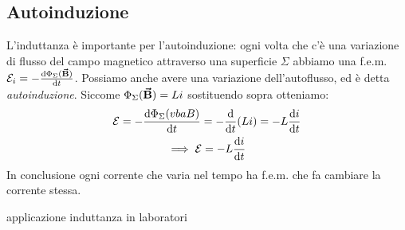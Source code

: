 \subsection{Autoinduzione}
L'induttanza è importante per l'autoinduzione: ogni volta che c'è una variazione di flusso del campo magnetico attraverso una superficie $\Sigma$ abbiamo una f.e.m. $\mathcal{E}_i=-\dv{\Phi_\Sigma (\vb*{\va{B}})}{t}$. Possiamo anche avere una variazione dell'autoflusso, ed è detta \textit{autoinduzione}.
Siccome $\Phi_\Sigma(\vb*{\va{B}})=Li$ sostituendo sopra otteniamo:
\begin{gather*}
	\mathcal{E}=-\dv{\Phi_\Sigma(vba B)}{t}= -\dv{t}(Li)=-L\dv{i}{t}\\
	\implies \mathcal{E}=-L\dv{i}{t}
\end{gather*}
In conclusione ogni corrente che varia nel tempo ha f.e.m. che fa cambiare la corrente stessa.




applicazione induttanza in laboratori
